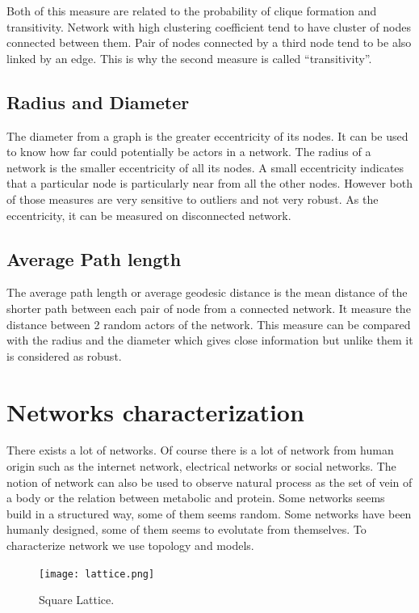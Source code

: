 \documentclass[a4paper, 12pt]{report}
\begin{document}
Both of this measure are related to the probability of clique formation and transitivity. Network with high clustering coefficient tend to have cluster of nodes connected between them. Pair of nodes connected by a third node tend to be also linked by an edge. This is why the second measure is called ``transitivity''.\\

\subsection{Radius and Diameter}
The diameter from a graph is the greater eccentricity of its nodes. It can be used to know how far could potentially be actors in a network. The radius of a network is the smaller eccentricity of all its nodes. A small eccentricity indicates that a particular node is particularly near from all the other nodes. However both of those measures are very sensitive to outliers and not very robust. As the eccentricity, it can be measured on disconnected network.

\subsection{Average Path length}
The average path length \citep{path_length} or average geodesic distance is the mean distance of the shorter path between each pair of node from a connected network. It measure the distance between 2 random actors of the network. This measure can be compared with the radius and the diameter which gives close information but unlike them it is considered as robust.
 
\section{Networks characterization}
There exists a lot of networks. Of course there is a lot of network from human origin such as the internet network, electrical networks or social networks. The notion of network can also be used to observe natural process as the set of vein of a body or the relation between metabolic and protein. Some networks seems build in a structured way, some of them seems random. Some networks have been humanly designed, some of them seems to evolutate from themselves. To characterize network we use topology and models.\\
\begin{figure}
\centering
\texttt{[image: lattice.png]}
\caption{Square Lattice. \citep{complex_networks} }
\label{lattice}
\end{figure}
\end{document}
